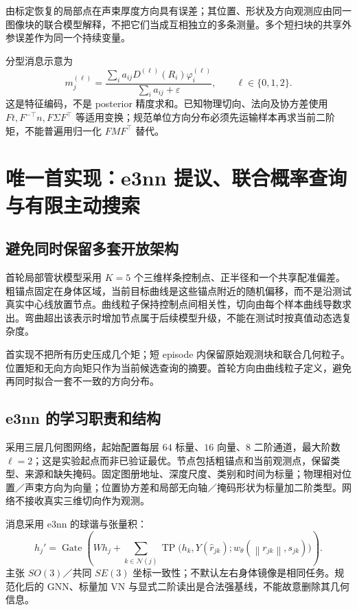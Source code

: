 \documentclass[UTF8,fontset=fandol,11pt,a4paper]{ctexart}
\theoremstyle{plain}
\theoremstyle{definition}
\theoremstyle{remark}
\numberwithin{equation}{section}
\newcommand{\norm}[1]{\left\lVert#1\right\rVert}
\begin{document}
由标定恢复的局部点在声束厚度方向具有误差；其位置、形状及方向观测应由同一图像块的联合模型解释，不把它们当成互相独立的多条测量。多个短扫块的共享外参误差作为同一个持续变量。

分型消息示意为
\begin{equation}
 m_j^{(\ell)}=\frac{\sum_i a_{ij}D^{(\ell)}(R_i)\varphi_i^{(\ell)}}{\sum_i a_{ij}+\varepsilon},
 \qquad \ell\in\{0,1,2\}.
 \label{eq:lift}
\end{equation}
这是特征编码，不是 posterior 精度求和。已知物理切向、法向及协方差使用 $Ft,F^{-\top}n,F\Sigma F^\top$ 等适用变换；规范单位方向分布必须先运输样本再求当前二阶矩，不能普遍用归一化 $FMF^\top$ 替代。

\section{唯一首实现：e3nn 提议、联合概率查询与有限主动搜索}
\label{sec:method}
\subsection{避免同时保留多套开放架构}
首轮局部管状模型采用 $K=5$ 个三维样条控制点、正半径和一个共享配准偏差。粗锚点固定在身体区域，当前目标曲线是这些锚点附近的随机偏移，而不是沿测试真实中心线放置节点。曲线粒子保持控制点间相关性，切向由每个样本曲线导数求出。弯曲超出该表示时增加节点属于后续模型升级，不能在测试时按真值动态选复杂度。

首实现不把所有历史压成几个矩；短 episode 内保留原始观测块和联合几何粒子。位置矩和无向方向矩只作为当前候选查询的摘要。首轮方向由曲线粒子定义，避免再同时拟合一套不一致的方向分布。

\subsection{e3nn 的学习职责和结构}
采用三层几何图网络，起始配置每层 $64$ 标量、$16$ 向量、$8$ 二阶通道，最大阶数 $\ell=2$；这是实验起点而非已验证最优。节点包括粗锚点和当前观测点，保留类型、来源和缺失掩码。固定图册地址、深度尺度、类别和时间为标量；物理相对位置／声束方向为向量；位置协方差和局部无向轴／掩码形状为标量加二阶类型。网络不接收真实三维切向作为观测。

消息采用 e3nn 的球谐与张量积\cite{e3nn}：
\begin{equation}
 h_j'=\operatorname{Gate}\left(Wh_j+\sum_{k\in\mathcal N(j)}
 \operatorname{TP}\bigl(h_k,Y(\widehat r_{jk});w_\theta(\norm{r_{jk}},s_{jk})\bigr)\right).
\end{equation}
主张 $SO(3)$／共同 $SE(3)$ 坐标一致性；不默认左右身体镜像是相同任务。规范化后的 GNN、标量加 VN 与显式二阶读出是合法强基线，不能故意删除其几何信息。
\end{document}

